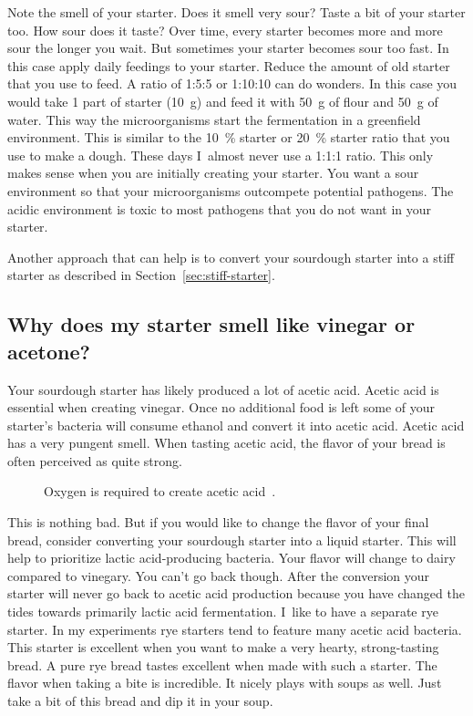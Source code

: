 Note the smell of your starter. Does it smell very sour?
Taste a bit of your starter too. How sour does it taste?
Over time, every starter becomes more and more sour the longer
you wait. But sometimes your starter becomes sour too fast.
In this case apply daily feedings to your starter. Reduce
the amount of old starter that you use to feed. A ratio
of 1:5:5 or 1:10:10 can do wonders. In this case you would
take 1 part of starter (\qty{10}{\gram}) and feed it with \qty{50}{\gram} of flour
and \qty{50}{\gram} of water. This way the microorganisms start
the fermentation in a greenfield environment. This is
similar to the \qty{10}{\percent} starter or  \qty{20}{\percent} starter
ratio that you use to make a dough. These days I~almost
never use a 1:1:1 ratio. This only makes sense when you
are initially creating your starter. You want a sour
environment so that your microorganisms outcompete
potential pathogens. The acidic environment is toxic
to most pathogens that you do not want in your starter.

Another approach that can help is to convert your
sourdough starter into a stiff starter as
described in Section~\ref{sec:stiff-starter}.

\subsection{Why does my starter smell like vinegar or acetone?}

Your sourdough starter has likely produced a lot of acetic acid.
Acetic acid is essential when creating vinegar. Once no additional
food is left some of your starter's bacteria will consume ethanol
and convert it into acetic acid. Acetic acid has a very pungent smell.
When tasting acetic acid, the flavor of your bread is often perceived
as quite strong.

\begin{figure}[!htb]
\centering
  
  \caption[Acetic acid creation]{Oxygen is required to create acetic
      acid~\cite{acetic+acid+production}.}%
  \label{fig:ethanol-oxidation}
\end{figure}

This is nothing bad. But if you would like to change
the flavor of your final bread, consider converting
your sourdough starter into a liquid starter. This will
help to prioritize lactic acid-producing bacteria.
Your flavor will change to dairy compared to vinegary.
You can't go back though. After the conversion your starter
will never go back to acetic acid production because you have
changed the tides towards primarily lactic acid fermentation.
I~like to have a separate rye starter. In my experiments
rye starters tend to feature many acetic acid bacteria.
This starter is excellent when you want to make a very hearty,
strong-tasting bread. A pure rye bread tastes excellent when
made with such a starter. The flavor when taking a bite
is incredible. It nicely plays with soups as well. Just take
a bit of this bread and dip it in your soup.

